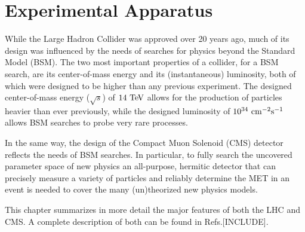 \chapter{Experimental Apparatus}

While the Large Hadron Collider was approved over 20 years ago, much of its design was influenced by the needs of searches for physics beyond the Standard Model (BSM).
The two most important properties of a collider, for a BSM search, are its center-of-mass energy and its (instantaneous) luminosity, both of which were designed to be higher than any previous experiment. 
The designed center-of-mass energy ($\sqrt{s}$) of $14~\mathrm{Te\kern -0.1em V}$ allows for the production of particles heavier than ever previously, while the designed luminosity of $10^{34}~\mathrm{cm}^{-2}\mathrm{s}^{-1}$ allows BSM searches to probe very rare processes.

In the same way, the design of the Compact Muon Solenoid (CMS) detector reflects the needs of BSM searches.
In particular, to fully search the uncovered parameter space of new physics an all-purpose, hermitic detector that can precisely measure a variety of particles and reliably determine the MET in an event is needed to cover the many (un)theorized new physics models.

This chapter summarizes in more detail the major features of both the LHC and CMS.
A complete description of both can be found in Refs.[INCLUDE].

